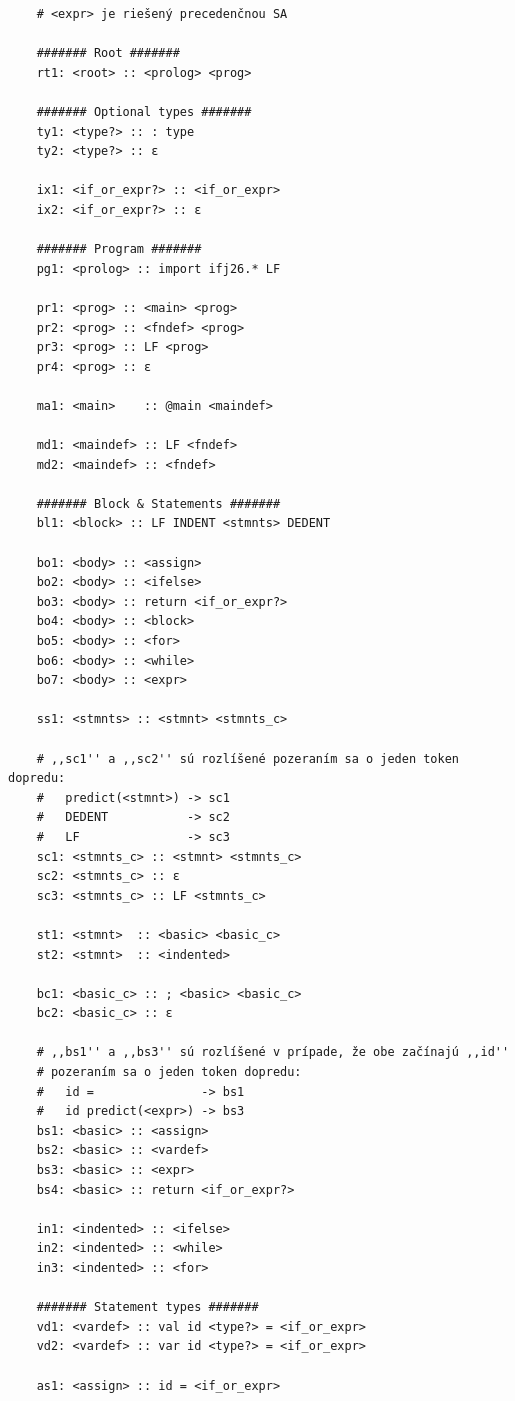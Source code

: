 \documentclass[11pt,a4paper]{article}
\begin{document}
  \begin{verbatim}
    # <expr> je riešený precedenčnou SA

    ####### Root #######
    rt1: <root> :: <prolog> <prog>

    ####### Optional types #######
    ty1: <type?> :: : type
    ty2: <type?> :: ε

    ix1: <if_or_expr?> :: <if_or_expr>
    ix2: <if_or_expr?> :: ε

    ####### Program #######
    pg1: <prolog> :: import ifj26.* LF

    pr1: <prog> :: <main> <prog>
    pr2: <prog> :: <fndef> <prog>
    pr3: <prog> :: LF <prog>
    pr4: <prog> :: ε

    ma1: <main>    :: @main <maindef>

    md1: <maindef> :: LF <fndef>
    md2: <maindef> :: <fndef>

    ####### Block & Statements #######
    bl1: <block> :: LF INDENT <stmnts> DEDENT

    bo1: <body> :: <assign>
    bo2: <body> :: <ifelse>
    bo3: <body> :: return <if_or_expr?>
    bo4: <body> :: <block>
    bo5: <body> :: <for>
    bo6: <body> :: <while>
    bo7: <body> :: <expr>

    ss1: <stmnts> :: <stmnt> <stmnts_c>

    # ,,sc1'' a ,,sc2'' sú rozlíšené pozeraním sa o jeden token dopredu:
    #   predict(<stmnt>) -> sc1
    #   DEDENT           -> sc2
    #   LF               -> sc3
    sc1: <stmnts_c> :: <stmnt> <stmnts_c>
    sc2: <stmnts_c> :: ε
    sc3: <stmnts_c> :: LF <stmnts_c>
    
    st1: <stmnt>  :: <basic> <basic_c>
    st2: <stmnt>  :: <indented> 

    bc1: <basic_c> :: ; <basic> <basic_c>
    bc2: <basic_c> :: ε

    # ,,bs1'' a ,,bs3'' sú rozlíšené v prípade, že obe začínajú ,,id''
    # pozeraním sa o jeden token dopredu:
    #   id =               -> bs1
    #   id predict(<expr>) -> bs3
    bs1: <basic> :: <assign>
    bs2: <basic> :: <vardef>
    bs3: <basic> :: <expr>
    bs4: <basic> :: return <if_or_expr?>

    in1: <indented> :: <ifelse>
    in2: <indented> :: <while>
    in3: <indented> :: <for>

    ####### Statement types #######
    vd1: <vardef> :: val id <type?> = <if_or_expr>
    vd2: <vardef> :: var id <type?> = <if_or_expr>

    as1: <assign> :: id = <if_or_expr>


\end{verbatim}
\end{document}
